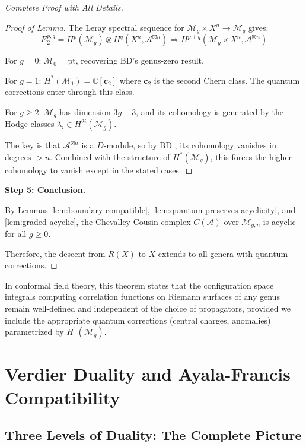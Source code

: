 \begin{proof}[Complete Proof with All Details]
\begin{proof}[Proof of Lemma]
The Leray spectral sequence for $\mathcal{M}_g \times X^n \to \mathcal{M}_g$ gives:
$$E_2^{p,q} = H^p(\mathcal{M}_g) \otimes H^q(X^n, \mathcal{A}^{\boxtimes n}) 
\Rightarrow H^{p+q}(\mathcal{M}_g \times X^n, \mathcal{A}^{\boxtimes n})$$

For $g=0$: $\mathcal{M}_0 = \text{pt}$, recovering BD's genus-zero result.

For $g=1$: $H^*(\mathcal{M}_1) = \mathbb{C}[\mathbf{c}_2]$ where $\mathbf{c}_2$ is the 
second Chern class. The quantum corrections enter through this class.

For $g \geq 2$: $\mathcal{M}_g$ has dimension $3g-3$, and its cohomology is generated 
by the Hodge classes $\lambda_i \in H^{2i}(\mathcal{M}_g)$.

The key is that $\mathcal{A}^{\boxtimes n}$ is a $D$-module, so by BD \cite[Lemma 4.2.10]{BD04}, 
its cohomology vanishes in degrees $> n$. Combined with the structure of $H^*(\mathcal{M}_g)$, 
this forces the higher cohomology to vanish except in the stated cases.
\end{proof}

\textbf{Step 5: Conclusion.}

By Lemmas \ref{lem:boundary-compatible}, \ref{lem:quantum-preserves-acyclicity}, and 
\ref{lem:graded-acyclic}, the Chevalley-Cousin complex $C(\mathcal{A})$ over 
$\mathcal{M}_{g,n}$ is acyclic for all $g \geq 0$.

Therefore, the descent from $R(X)$ to $X$ extends to all genera with quantum corrections.
\end{proof}

\begin{remark}\label{rem:physical-higher-genus-descent}
In conformal field theory, this theorem states that the configuration space 
integrals computing correlation functions on Riemann surfaces of any genus remain 
well-defined and independent of the choice of propagators, provided we include the 
appropriate quantum corrections (central charges, anomalies) parametrized by 
$H^1(\mathcal{M}_g)$.
\end{remark}

\section{Verdier Duality and Ayala-Francis Compatibility}
\label{sec:verdier-ayala-francis}

\subsection{Three Levels of Duality: The Complete Picture}
\label{subsec:three-dualities}

